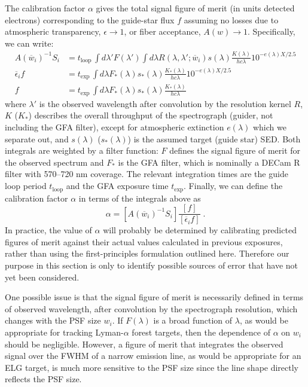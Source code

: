 \documentclass[11pt]{article}
\begin{document}
The calibration factor $\alpha$ gives the total signal figure of merit (in units detected electrons) corresponding to the guide-star flux $f$ assuming no losses due to atmospheric transparency, $\epsilon\rightarrow 1$, or fiber acceptance, $A(w)\rightarrow 1$. Specifically, we can write:
\begin{align}
A(\overline{w}_i)^{-1} S_i &= t_{\text{loop}}\,\int d\lambda' F(\lambda')
\int d\lambda R(\lambda,\lambda';\overline{w}_i) s(\lambda) \frac{K(\lambda)}{h c \lambda} 10^{-e(\lambda)X/2.5} \\
\overline{\epsilon}_i f &= t_{\text{exp}}\,
\int d\lambda F_\ast(\lambda) s_\ast(\lambda) \frac{K_\ast(\lambda)}{h c \lambda} 10^{-e(\lambda)X/2.5} \\
f &= t_{\text{exp}}\,
\int d\lambda F_\ast(\lambda) s_\ast(\lambda) \frac{K_\ast(\lambda)}{h c \lambda}
\end{align}
where $\lambda'$ is the observed wavelength after convolution by the resolution kernel $R$, $K$ ($K_\ast$) describes the overall throughput of the spectrograph (guider, not including the GFA filter), except for atmospheric extinction $e(\lambda)$ which we separate out, and $s(\lambda)$ ($s_\ast(\lambda)$) is the assumed target (guide star) SED. Both integrals are weighted by a filter function: $F$ defines the signal figure of merit for the observed spectrum and $F_\ast$ is the GFA filter, which is nominally a DECam R filter with 570--720 nm coverage.  The relevant integration times are the guide loop period $t_{\text{loop}}$ and the GFA exposure time $t_{\text{exp}}$. Finally, we can define the calibration factor $\alpha$ in terms of the integrals above as
\begin{equation}
\alpha = \left[A(\overline{w}_i)^{-1} S_i\right]\frac{[f]}{[\overline{\epsilon}_i f]} \; .
\end{equation}
In practice, the value of $\alpha$ will probably be determined by calibrating predicted figures of merit against their actual values calculated in previous exposures, rather than using the first-principles formulation outlined here.  Therefore our purpose in this section is only to identify possible sources of error that have not yet been considered.

One possible issue is that the signal figure of merit is necessarily defined in terms of observed wavelength, after convolution by the spectrograph resolution, which changes with the PSF size $w_i$.  If $F(\lambda)$ is a broad function of $\lambda$, as would be appropriate for tracking Lyman-$\alpha$ forest targets, then the dependence of $\alpha$ on $w_i$ should be negligible. However, a figure of merit that integrates the observed signal over the FWHM of a narrow emission line, as would be appropriate for an ELG target, is much more sensitive to the PSF size since the line shape directly reflects the PSF size.
\end{document}
